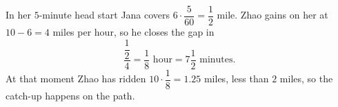 In her $5$-minute head start Jana covers $6\cdot\dfrac{5}{60}=\dfrac{1}{2}$ mile. Zhao gains on her at $10-6=4$ miles per hour, so he closes the gap in
\[
\dfrac{\dfrac{1}{2}}{4}=\dfrac{1}{8}\text{ hour}=\boxed{7\dfrac{1}{2}}\text{ minutes}.
\]
At that moment Zhao has ridden $10\cdot\dfrac{1}{8}=1.25$ miles, less than $2$ miles, so the catch-up happens on the path.
